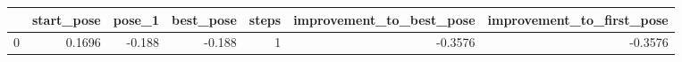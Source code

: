 \begin{tabular}{lrrrrrr}
\toprule
{} &  start\_pose &  pose\_1 &  best\_pose &  steps &  improvement\_to\_best\_pose &  improvement\_to\_first\_pose \\
\midrule
0 &      0.1696 &  -0.188 &     -0.188 &      1 &                   -0.3576 &                    -0.3576 \\
\bottomrule
\end{tabular}
